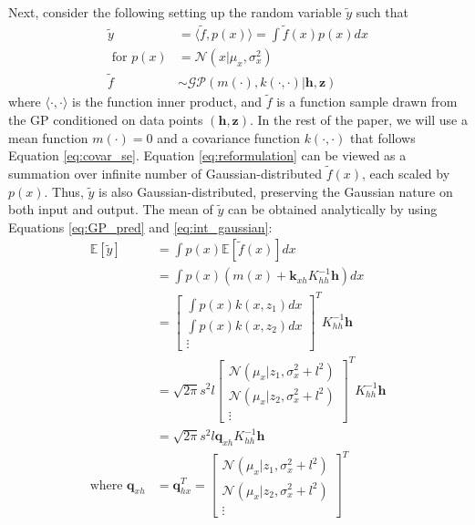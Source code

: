 \documentclass{article}
\begin{document}
Next, consider the following setting up the random variable $\tilde{y}$ such that
\begin{equation}
\begin{aligned}
	\tilde{y}&=\langle \tilde{f}, p(x)\rangle=\int \tilde{f}(x) p(x)dx \\
    \text{ for }p(x)&=\mathcal{N}(x|\mu_x,\sigma_x^2) \\
    \tilde{f}&\sim\mathcal{GP}(m(\cdot),k(\cdot,\cdot)|\boldsymbol{h},\boldsymbol{z})
    \label{eq:reformulation}
\end{aligned}
\end{equation}
where $\langle\cdot,\cdot\rangle$ is the function inner product, and $\tilde{f}$ is a function sample drawn from the GP conditioned on data points $(\boldsymbol{h},\boldsymbol{z})$. In the rest of the paper, we will use a mean function $m(\cdot)=0$ and a covariance function $k(\cdot, \cdot)$ that follows Equation \ref{eq:covar_se}. Equation \ref{eq:reformulation} can be viewed as a summation over infinite number of Gaussian-distributed $\tilde{f}(x)$, each scaled by $p(x)$. Thus, $\tilde{y}$ is also Gaussian-distributed, preserving the Gaussian nature on both input and output. The mean of $\tilde{y}$ can be obtained analytically by using Equations \ref{eq:GP_pred} and \ref{eq:int_gaussian}:
\begin{equation}
    \begin{aligned}
        \mathbb{E}\left[\tilde{y}\right]&=\int p(x)\mathbb{E}\left[\tilde{f}(x)\right]dx \\
        &=\int p(x)\left(m(x)+\boldsymbol{k}_{xh}K_{hh}^{-1}\boldsymbol{h}\right)dx \\
        &=\begin{bmatrix}
            \int p(x)k(x,z_1)dx \\
            \int p(x)k(x,z_2)dx \\
            \vdots
        \end{bmatrix}^T K_{hh}^{-1}\boldsymbol{h} \\
        &=\sqrt{2\pi}s^2l\begin{bmatrix}
            \mathcal{N}(\mu_x|z_1,\sigma_x^2+l^2) \\
            \mathcal{N}(\mu_x|z_2,\sigma_x^2+l^2) \\
            \vdots
        \end{bmatrix}^TK_{hh}^{-1}\boldsymbol{h} \\
        &=\sqrt{2\pi}s^2l\boldsymbol{q}_{xh}K_{hh}^{-1}\boldsymbol{h} \\
        \text{where }\boldsymbol{q}_{xh}&=\boldsymbol{q}_{hx}^T=\begin{bmatrix}
            \mathcal{N}(\mu_x|z_1,\sigma_x^2+l^2) \\
            \mathcal{N}(\mu_x|z_2,\sigma_x^2+l^2) \\
            \vdots
        \end{bmatrix}^T
    \end{aligned}
\end{equation}
\end{document}
